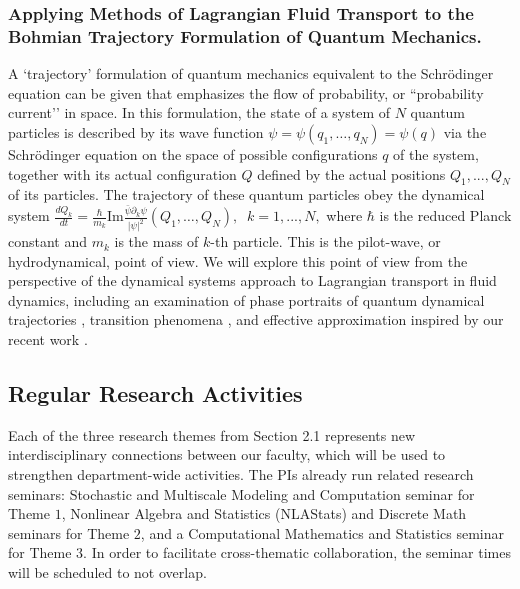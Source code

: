 \documentclass[11pt]{NSFamsart}
\begin{document}
\subsubsection*{Applying Methods of Lagrangian Fluid Transport to the Bohmian Trajectory Formulation of Quantum Mechanics.}   A `trajectory'  formulation of quantum mechanics  equivalent to the Schr\"{o}dinger equation can be given \cite{Bohmian, Holland1993TheQT} that emphasizes the flow of probability, or ``probability current’’ in space. 
In this formulation, the state of a system of $N$ quantum particles is described by its wave function $\psi=\psi(q_1,…,q_N)=\psi(q)$ via the Schr\"{o}dinger equation  on the space of possible configurations $q$ of the system, together with its actual configuration $Q$ defined by the actual positions $Q_1,...,Q_N$ of its particles. The trajectory of these quantum particles obey the dynamical system
$
\frac{dQ_k}{dt}= \frac{\hbar}{m_k} \text{Im} \frac{\bar\psi  \partial_k \psi}{|\psi|^2}(Q_1,…,Q_N),\;\; k=1, ..., N,  
$
where $\hbar$ is the reduced Planck constant and $m_k$ is the mass of $k$-th particle.
This is the pilot-wave, or hydrodynamical, point of view. We will explore this point of view from the perspective of the dynamical systems approach to Lagrangian transport in fluid dynamics, including an examination of phase portraits of quantum dynamical trajectories \cite{Berndl1995OnTG}, transition phenomena \cite{waalkens2007wigner,Micha2006QuantumDW, Dittrich2016}, and effective approximation inspired by our recent work \cite{Li2021BohmianTO}. 
\fi


\subsection{Regular Research  Activities}
Each of the three research themes from Section 2.1 represents new interdisciplinary connections between our faculty, which will be used to strengthen department-wide activities. The PIs already run related research seminars: 
Stochastic and Multiscale Modeling and Computation seminar for Theme $1$, Nonlinear Algebra and Statistics (NLAStats) and Discrete Math seminars for Theme $2$, and a Computational Mathematics and Statistics seminar for Theme $3$.
In order to facilitate cross-thematic collaboration, the seminar times will be scheduled to not overlap. 
\end{document}
